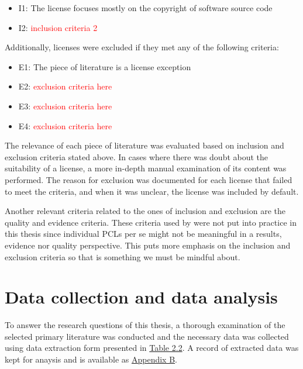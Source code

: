 \begin{itemize}
	\item I1: The license focuses mostly on the copyright of software source code
	\item I2: \textcolor{red}{inclusion criteria 2}
\end{itemize}

Additionally, licenses were excluded if they met any of the following criteria:

\begin{itemize}
	\item E1: The piece of literature is a license exception
	\item E2: \textcolor{red}{exclusion criteria here}
	\item E3: \textcolor{red}{exclusion criteria here}
	\item E4: \textcolor{red}{exclusion criteria here}
\end{itemize}

The relevance of each piece of literature was evaluated based on inclusion and exclusion criteria stated above. In cases where there was doubt about the suitability of a license, a more in-depth manual examination of its content was performed. The reason for exclusion was documented for each license that failed to meet the criteria, and when it was unclear, the license was included by default.

Another relevant criteria related to the ones of inclusion and exclusion are the quality and evidence criteria. These criteria used by \cite{dyba2007} were not put into practice in this thesis since individual PCLs per se might not be meaningful in a results, evidence nor quality perspective. This puts more emphasis on the inclusion and exclusion criteria so that is something we must be mindful about.

\section{Data collection and data analysis}
To answer the research questions of this thesis, a thorough examination of the selected primary literature was conducted and the necessary data was collected using data extraction form presented in \hyperref[table:extraction]{Table 2.2}. A record of extracted data was kept for anaysis and is available as \hyperref[appendix:b]{Appendix B}.

